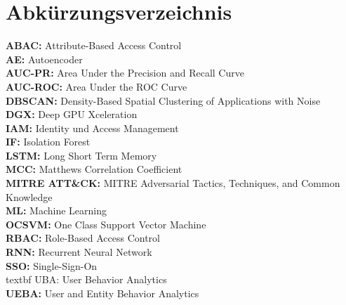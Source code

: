 \documentclass[a4paper,12pt]{article}
\begin{document}
	\section*{Abkürzungsverzeichnis}
	
	\textbf{ABAC:} Attribute-Based Access Control \\[1em]
	\textbf{AE:} Autoencoder \\[1em]
	\textbf{AUC-PR:} Area Under the Precision and Recall Curve \\[1em]
	\textbf{AUC-ROC:} Area Under the ROC Curve \\[1em]
	\textbf{DBSCAN:} Density-Based Spatial Clustering of Applications with Noise \\[1em]
	\textbf{DGX:} Deep GPU Xceleration \\[1em]
	\textbf{IAM:} Identity und Access Management \\[1em]
	\textbf{IF:} Isolation Forest \\[1em]
	\textbf{LSTM:} Long Short Term Memory \\[1em]
	\textbf{MCC:} Matthews Correlation Coefficient \\[1em]
	\textbf{MITRE ATT\&CK: } MITRE Adversarial Tactics, Techniques, 
		and Common Knowledge \\[1em]
	\textbf{ML:} Machine Learning \\[1em]
	\textbf{OCSVM:} One Class Support Vector Machine \\[1em]
	\textbf{RBAC:} Role-Based Access Control \\[1em]
	\textbf{RNN:} Recurrent Neural Network \\[1em]
	\textbf{SSO:} Single-Sign-On \\[1em]
	textbf {UBA:} User Behavior Analytics \\[0.1em]
	\textbf {UEBA:} User and Entity Behavior Analytics \\[0.1em]
	
	\newpage
	
	
	
	
\end{document}
